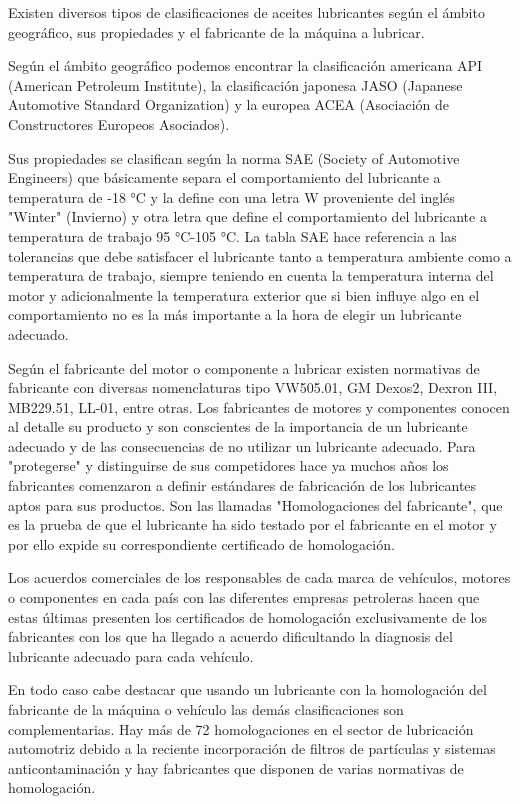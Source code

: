 \documentclass[../main]{subfiles}
\begin{document}
Existen diversos tipos de clasificaciones de aceites lubricantes según el ámbito geográfico, sus propiedades y el fabricante de la máquina a lubricar.

Según el ámbito geográfico podemos encontrar la clasificación americana API (American Petroleum Institute), la clasificación japonesa JASO (Japanese Automotive Standard Organization) y la europea ACEA (Asociación de Constructores Europeos Asociados).

Sus propiedades se clasifican según la norma SAE (Society of Automotive Engineers) que básicamente separa el comportamiento del lubricante a temperatura de -18 °C y la define con una letra W proveniente del inglés "Winter" (Invierno) y otra letra que define el comportamiento del lubricante a temperatura de trabajo 95 °C-105 °C. La tabla SAE hace referencia a las tolerancias que debe satisfacer el lubricante tanto a temperatura ambiente como a temperatura de trabajo, siempre teniendo en cuenta la temperatura interna del motor y adicionalmente la temperatura exterior que si bien influye algo en el comportamiento no es la más importante a la hora de elegir un lubricante adecuado.


Según el fabricante del motor o componente a lubricar existen normativas de fabricante con diversas nomenclaturas tipo VW505.01, GM Dexos2, Dexron III, MB229.51, LL-01, entre otras. Los fabricantes de motores y componentes conocen al detalle su producto y son conscientes de la importancia de un lubricante adecuado y de las consecuencias de no utilizar un lubricante adecuado. Para "protegerse" y distinguirse de sus competidores hace ya muchos años los fabricantes comenzaron a definir estándares de fabricación de los lubricantes aptos para sus productos. Son las llamadas "Homologaciones del fabricante", que es la prueba de que el lubricante ha sido testado por el fabricante en el motor y por ello expide su correspondiente certificado de homologación.

Los acuerdos comerciales de los responsables de cada marca de vehículos, motores o componentes en cada país con las diferentes empresas petroleras hacen que estas últimas presenten los certificados de homologación exclusivamente de los fabricantes con los que ha llegado a acuerdo dificultando la diagnosis del lubricante adecuado para cada vehículo.

En todo caso cabe destacar que usando un lubricante con la homologación del fabricante de la máquina o vehículo las demás clasificaciones son complementarias. Hay más de 72 homologaciones en el sector de lubricación automotriz debido a la reciente incorporación de filtros de partículas y sistemas anticontaminación y hay fabricantes que disponen de varias normativas de homologación.
\end{document}
